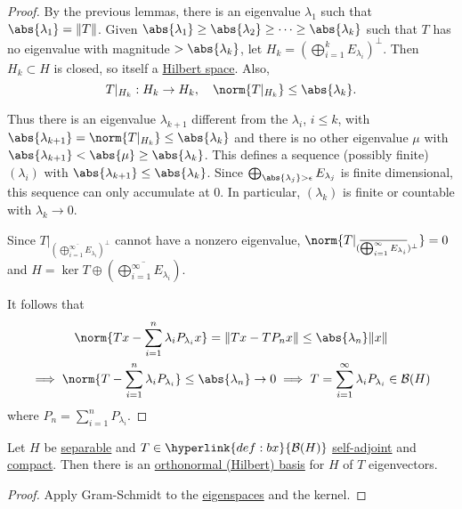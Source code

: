 \documentclass{article}
\begin{document}
\begin{proof}
    By the previous lemmas, there is an eigenvalue $\lambda_1$ such that $\abs{\lambda_1} = \|T\|$.
    Given $\abs{\lambda_1} \geq \abs{\lambda_2} \geq \dotsb \geq \abs{\lambda_k}$ such that $T$ has no eigenvalue with magnitude $> \abs{\lambda_k}$, let $H_k = \left(\bigoplus_{i=1}^k E_{\lambda_i}\right)^\perp$.
    Then $H_k \subset H$ is closed, so itself a \hyperlink{def:euclidean}{Hilbert space}.
    Also,
    \begin{equation*}
        T|_{H_k} : H_k \to H_k, \quad \norm{T|_{H_k}} \leq \abs{\lambda_k}.
    \end{equation*}

    Thus there is an eigenvalue $\lambda_{k + 1}$ different from the $\lambda_i$, $i \leq k$, with $\abs{\lambda_{k+1}} = \norm{T|_{H_k}} \leq \abs{\lambda_k}$ and there is no other eigenvalue $\mu$ with $\abs{\lambda_{k+1}} < \abs{\mu} \geq \abs{\lambda_k}$.
    This defines a sequence (possibly finite) $(\lambda_i)$ with $\abs{\lambda_{k+1}} \leq \abs{\lambda_k}$.
    Since
    $\bigoplus_{\abs{\lambda_j} > \epsilon} E_{\lambda_j}$ is finite dimensional, this sequence can only accumulate at 0.
    In particular, $(\lambda_k)$ is finite or countable with $\lambda_k \to 0$.

    Since $T|_{(\overline{\bigoplus_{i=1}^\infty E_{\lambda_i}})^\perp}$ cannot have a nonzero eigenvalue, $\norm{T|_{(\overline{\bigoplus_{i=1}^\infty E_{\lambda_i}})^\perp}} = 0$ and $H = \ker T \oplus (\overline{\bigoplus_{i=1}^\infty E_{\lambda_i}})$.

    It follows that
    \begin{gather*}
        \norm{T x - \sum_{i=1}^n \lambda_i P_{\lambda_i} x} = \|T x - T P_n x\| \leq \abs{\lambda_n} \|x\| \\
        \implies \norm{T - \sum_{i=1}^n \lambda_i P_{\lambda_i}} \leq \abs{\lambda_n} \to 0 \implies T = \sum_{i=1}^\infty \lambda_i P_{\lambda_i} \in \mathcal{B}(H)
    \end{gather*}
    where $P_n = \sum_{i=1}^n P_{\lambda_i}$.
\end{proof}

\begin{cor}
    Let $H$ be \hyperlink{def:separable}{separable} and $T \in \hyperlink{def:bx}{\mathcal{B}(H)}$ \hyperlink{def:normalMap}{self-adjoint} and \hyperlink{def:compact}{compact}.
    Then there is an \hyperlink{def:basis}{orthonormal (Hilbert) basis} for $H$ of $T$ eigenvectors.
\end{cor}
\begin{proof}
    Apply Gram-Schmidt to the \hyperlink{def:espace}{eigenspaces} and the kernel.
\end{proof}
\end{document}
